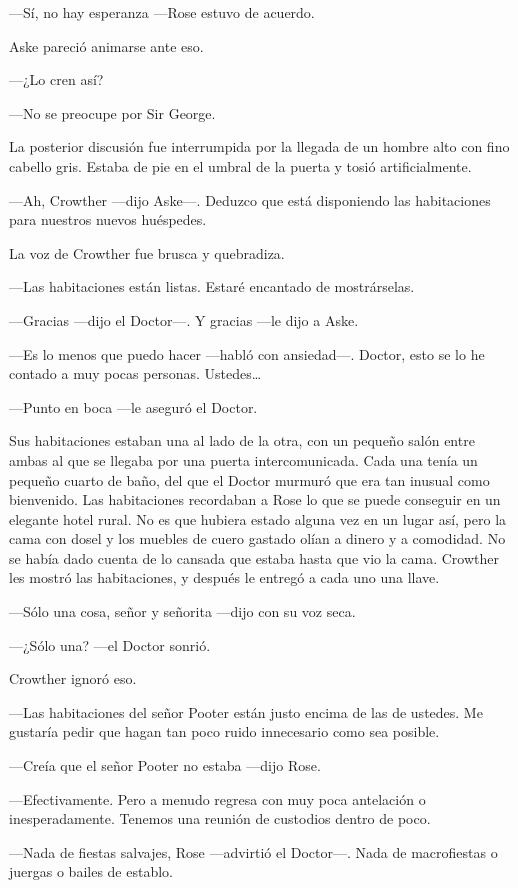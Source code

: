 {---Sí, no hay esperanza ---Rose estuvo de acuerdo.}

{Aske pareció animarse ante eso.}

{---¿Lo cren así?}

{---No se preocupe por Sir George.}

{La posterior discusión fue interrumpida por la llegada de un hombre
	alto con fino cabello gris. Estaba de pie en el umbral de la puerta y
tosió artificialmente.}

{---Ah, Crowther ---dijo Aske---. Deduzco que está disponiendo las
habitaciones para nuestros nuevos huéspedes.}

{La voz de Crowther fue brusca y quebradiza.}

{---Las habitaciones están listas. Estaré encantado de mostrárselas.}

{---Gracias ---dijo el Doctor---. Y gracias ---le dijo a Aske.}

{---Es lo menos que puedo hacer ---habló con ansiedad---. Doctor, esto
	se lo he contado a muy pocas personas. Ustedes\ldots{}}

{---Punto en boca ---le aseguró el Doctor.}

{Sus habitaciones estaban una al lado de la otra, con un pequeño salón
	entre ambas al que se llegaba por una puerta intercomunicada. Cada una
	tenía un pequeño cuarto de baño, del que el Doctor murmuró que era tan
	inusual como bienvenido. Las habitaciones recordaban a Rose lo que se
	puede conseguir en un elegante hotel rural. No es que hubiera estado
	alguna vez en un lugar así, pero la cama con dosel y los muebles de
	cuero gastado olían a dinero y a comodidad. No se había dado cuenta de
	lo cansada que estaba hasta que vio la cama. Crowther les mostró las
habitaciones, y después le entregó a cada uno una llave.}

{---Sólo una cosa, señor y señorita ---dijo con su voz seca.}

{---¿Sólo una? ---el Doctor sonrió.}

{Crowther ignoró eso.}

{---Las habitaciones del señor Pooter están justo encima de las de
	ustedes. Me gustaría pedir que hagan tan poco ruido innecesario como sea
posible.}

{---Creía que el señor Pooter no estaba ---dijo Rose.}

{---Efectivamente. Pero a menudo regresa con muy poca antelación o
inesperadamente. Tenemos una reunión de custodios dentro de poco.}

{---Nada de fiestas salvajes, Rose ---advirtió el Doctor---. Nada de
macrofiestas o juergas o bailes de establo.}

